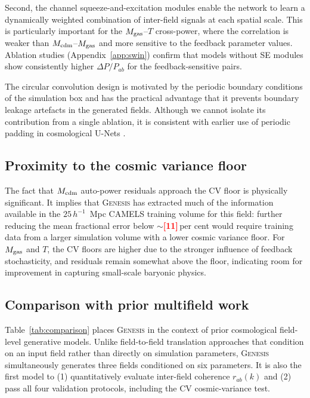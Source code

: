 \documentclass[usenatbib]{mnras}
\newcommand{\FILL}[1]{\textcolor{red}{\textbf{[#1]}}}
\newcommand{\Mcdm}{M_{\rm cdm}}
\newcommand{\Mgas}{M_{\rm gas}}
\newcommand{\Tgas}{T}
\newcommand{\DeltaP}{\Delta P/P}
\begin{document}
Second, the channel squeeze-and-excitation modules enable the network
to learn a dynamically weighted combination of inter-field signals at
each spatial scale.
This is particularly important for the $\Mgas$--$\Tgas$ cross-power,
where the correlation is weaker than $\Mcdm$--$\Mgas$ and more
sensitive to the feedback parameter values.
Ablation studies (Appendix~\ref{app:swin}) confirm that models without
SE modules show consistently higher $\DeltaP_{ab}$ for the
feedback-sensitive pairs.

The circular convolution design is motivated by the periodic boundary
conditions of the simulation box and has the practical advantage that it
prevents boundary leakage artefacts in the generated fields.
Although we cannot isolate its contribution from a single ablation, it
is consistent with earlier use of periodic padding in cosmological
U-Nets \citep[e.g.][]{Jamieson2022}.

\subsection{Proximity to the cosmic variance floor}
\label{sec:disc_cv}

The fact that $\Mcdm$ auto-power residuals approach the CV floor is
physically significant.
It implies that \textsc{Genesis} has extracted much of the
information available in the $25\,h^{-1}$~Mpc CAMELS training volume
for this field: further reducing the mean fractional error below
$\sim$\FILL{11}\,per cent would require training data from a larger
simulation volume with a lower cosmic variance floor.
For $\Mgas$ and $\Tgas$, the CV floors are higher due to the stronger
influence of feedback stochasticity, and residuals remain somewhat above
the floor, indicating room for improvement in capturing small-scale
baryonic physics.

\subsection{Comparison with prior multifield work}
\label{sec:disc_comparison}

Table~\ref{tab:comparison} places \textsc{Genesis} in the context of
prior cosmological field-level generative models.
Unlike field-to-field translation approaches
\citep{Mishra2026,Horowitz2025} that condition on an input field rather
than directly on simulation parameters, \textsc{Genesis} simultaneously
generates three fields conditioned on six parameters. It is also the
first model to (1) quantitatively evaluate inter-field coherence
$r_{ab}(k)$ and (2) pass all four validation protocols, including the
CV cosmic-variance test.
\end{document}
